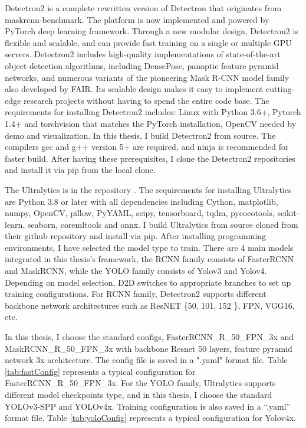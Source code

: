 Detectron2 is a complete rewritten version of Detectron that originates from maskrcnn-benchmark. The platform is now implemented and powered by PyTorch deep learning framework. Through a new modular design, Detectron2 is flexible and scalable, and can provide fast training on a single or multiple GPU servers. Detectron2 includes high-quality implementations of state-of-the-art object detection algorithms, including DensePose, panoptic feature pyramid networks, and numerous variants of the pioneering Mask R-CNN model family also developed by FAIR. Its scalable design makes it easy to implement cutting-edge research projects without having to spend the entire code base. The requirements for installing Detectron2 includes: Linux with Python 3.6+, Pytorch 1.4+ and torchvision that matches the PyTorch installation, OpenCV needed by demo and visualization. In this thesis, I build Detectron2 from source. The compilers gcc and g++ version 5+ are required, and ninja is recommended for faster build. After having these prerequisites, I clone the Detectron2 repositories and install it via pip from the local clone.

The Ultralytics  is in the repository \cite{ultralytics}. The requirements for installing Ultralytics are Python 3.8 or later with all dependencies including Cython, matplotlib, numpy, OpenCV, pillow, PyYAML, scipy, tensorboard, tqdm, pycocotools, scikit-learn, seaborn, coremltools and onnx. I build Ultralytics from source cloned from their github repository and install via pip.
After installing programming environments, I have selected the model type to train. There are 4 main models integrated in this thesis's framework, the RCNN family consists of FasterRCNN and MaskRCNN, while the YOLO family consists of Yolov3 and Yolov4. Depending on model selection, D2D switches to appropriate branches to set up training configurations. For RCNN family, Detectron2 supports different backbone network architectures such as ResNET \{50, 101, 152 \}, FPN, VGG16, etc.

In this thesis, I choose the standard configs, FasterRCNN\_R\_50\_FPN\_3x and MaskRCNN\_R\_50\_FPN\_3x with backbone Resnet 50 layers, feature pyramid network 3x architecture. The config file is saved in a ".yaml" format file. Table \ref{tab:fastConfig} represents a typical configuration for FasterRCNN\_R\_50\_FPN\_3x.
For the YOLO family, Ultralytics supports different model checkpoints type, and in this thesis, I choose the standard YOLOv3-SPP and YOLOv4x. Training configuration is also saved in a “.yaml” format file. Table \ref{tab:yoloConfig} represents a typical configuration for Yolov4x.

